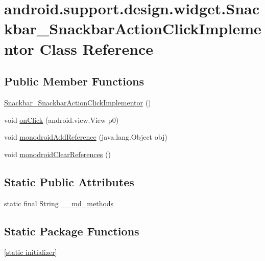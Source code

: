 \hypertarget{classandroid_1_1support_1_1design_1_1widget_1_1_snackbar___snackbar_action_click_implementor}{
\section{android.support.design.widget.Snackbar\_\-SnackbarActionClickImplementor Class Reference}
\label{classandroid_1_1support_1_1design_1_1widget_1_1_snackbar___snackbar_action_click_implementor}
}
\subsection*{Public Member Functions}
\begin{CompactItemize}
\item 
\hyperlink{classandroid_1_1support_1_1design_1_1widget_1_1_snackbar___snackbar_action_click_implementor_1d392f4895434ec586991a7b29333721}{Snackbar\_\-SnackbarActionClickImplementor} ()
\item 
void \hyperlink{classandroid_1_1support_1_1design_1_1widget_1_1_snackbar___snackbar_action_click_implementor_586c92095bd4bf2197feac9cf0024e30}{onClick} (android.view.View p0)
\item 
void \hyperlink{classandroid_1_1support_1_1design_1_1widget_1_1_snackbar___snackbar_action_click_implementor_16a751ffa24007d654bc9ce4f58393b1}{monodroidAddReference} (java.lang.Object obj)
\item 
void \hyperlink{classandroid_1_1support_1_1design_1_1widget_1_1_snackbar___snackbar_action_click_implementor_dc6c8f5bc2dfa81c878c441b7cd1aabe}{monodroidClearReferences} ()
\end{CompactItemize}
\subsection*{Static Public Attributes}
\begin{CompactItemize}
\item 
static final String \hyperlink{classandroid_1_1support_1_1design_1_1widget_1_1_snackbar___snackbar_action_click_implementor_ad3fa0ac0be924f89fc03341fb991061}{\_\-\_\-md\_\-methods}
\end{CompactItemize}
\subsection*{Static Package Functions}
\begin{CompactItemize}
\item 
\hyperlink{classandroid_1_1support_1_1design_1_1widget_1_1_snackbar___snackbar_action_click_implementor_702afccf500c0014bcad094615b10a52}{\mbox{[}static initializer\mbox{]}}
\end{CompactItemize}
